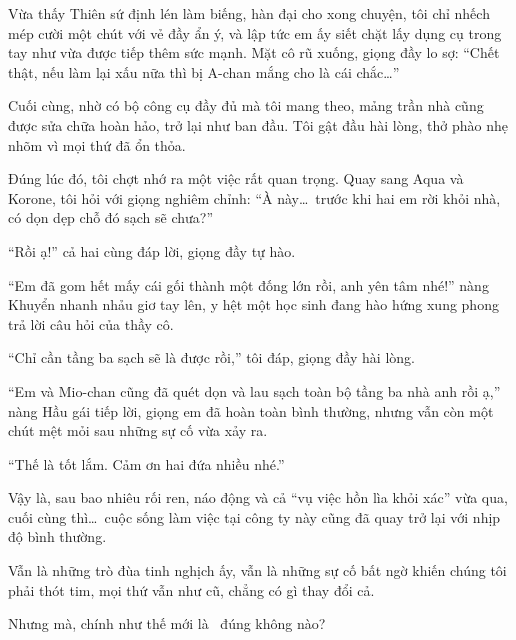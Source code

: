 \documentclass[../main.tex]{subfiles}
\begin{document}
Vừa thấy Thiên sứ định lén làm biếng, hàn đại cho xong chuyện, tôi chỉ nhếch mép cười một chút với vẻ đầy ẩn ý, và lập tức em ấy siết chặt lấy dụng cụ trong tay như vừa được tiếp thêm sức mạnh. Mặt cô rũ xuống, giọng đầy lo sợ: ``Chết thật, nếu làm lại xấu nữa thì bị A-chan mắng cho là cái chắc\dots''

Cuối cùng, nhờ có bộ công cụ đầy đủ mà tôi mang theo, mảng trần nhà cũng được sửa chữa hoàn hảo, trở lại như ban đầu. Tôi gật đầu hài lòng, thở phào nhẹ nhõm vì mọi thứ đã ổn thỏa.

Đúng lúc đó, tôi chợt nhớ ra một việc rất quan trọng. Quay sang Aqua và Korone, tôi hỏi với giọng nghiêm chỉnh: ``À này\dots\ trước khi hai em rời khỏi nhà, có dọn dẹp chỗ đó sạch sẽ chưa?''

``Rồi ạ!'' cả hai cùng đáp lời, giọng đầy tự hào.

``Em đã gom hết mấy cái gối thành một đống lớn rồi, anh yên tâm nhé!'' nàng Khuyển nhanh nhảu giơ tay lên, y hệt một học sinh đang hào hứng xung phong trả lời câu hỏi của thầy cô.

``Chỉ cần tầng ba sạch sẽ là được rồi,'' tôi đáp, giọng đầy hài lòng.

``Em và Mio-chan cũng đã quét dọn và lau sạch toàn bộ tầng ba nhà anh rồi ạ,'' nàng Hầu gái tiếp lời, giọng em đã hoàn toàn bình thường, nhưng vẫn còn một chút mệt mỏi sau những sự cố vừa xảy ra.

``Thế là tốt lắm. Cảm ơn hai đứa nhiều nhé.''

Vậy là, sau bao nhiêu rối ren, náo động và cả ``vụ việc hồn lìa khỏi xác'' vừa qua, cuối cùng thì\dots\ cuộc sống làm việc tại công ty này cũng đã quay trở lại với nhịp độ bình thường.

Vẫn là những trò đùa tinh nghịch ấy, vẫn là những sự cố bất ngờ khiến chúng tôi phải thót tim, mọi thứ vẫn như cũ, chẳng có gì thay đổi cả.

Nhưng mà, chính như thế mới là \hll\ đúng không nào?
\end{document}
